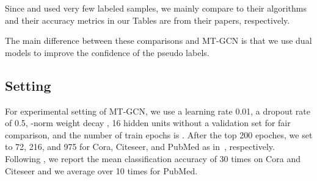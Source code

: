 \documentclass{article}
\begin{document}
Since \cite{li2018deeper} and \cite{sun2019multi} used very few labeled samples, we mainly compare to their algorithms and their accuracy metrics in our Tables are from their papers, respectively.

The main difference between these comparisons and MT-GCN is that we use dual models to improve the confidence of the pseudo labels.
\subsection{Setting}
For experimental setting of MT-GCN, we use a learning rate 0.01, a dropout rate of 0.5, -norm weight decay , 16 hidden units without a validation set for fair comparison, and the number of train epochs is . After the top 200 epoches, we set  to 72, 216, and 975 for Cora, Citeseer, and PubMed as in~\cite{li2018deeper}, respectively. Following \cite{li2018deeper}, we report the mean classification accuracy of 30 times on Cora and Citeseer and we average over 10 times for PubMed.
\end{document}
